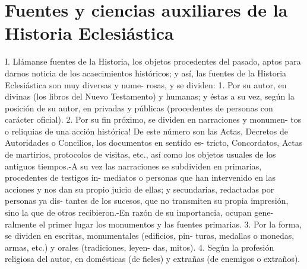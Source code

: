 \raggedbottom{} \documentclass[12pt]{book}
\begin{document}
\section{Fuentes y ciencias auxiliares de la Historia Eclesiástica}
I. Llámanse fuentes de la Historia, los objetos procedentes del
pasado, aptos para darnos noticia de los acaecimientos históricos; y
así, las fuentes de la Historia Eclesiástica son muy diversas y nume-
rosas, y se dividen: 1. Por su autor, en divinas (los libros del Nuevo
Testamento) y humanas; y éstas a su vez, según la posición de su
autor, en privadas y públicas (procedentes de personas con carácter
oficial). 2. Por su fin próximo, se dividen en narraciones y monumen-
tos o reliquias de una acción histórica! De este número son las Actas,
Decretos de Autoridades o Concilios, los documentos en sentido es-
tricto, Concordatos, Actas de martirios, protocolos de visitas, etc.,
así como los objetos usuales de los antiguos tiempos.-A su vez las
narraciones se subdividen en primarias, procedentes de testigos in-
mediatos o personas que han intervenido en las acciones y nos dan su
propio juicio de ellas; y secundarias, redactadas por personas ya dis-
tantes de los sucesos, que no transmiten su propia impresión, sino la
que de otros recibieron.-En razón de su importancia, ocupan gene-
ralmente el primer lugar los monumentos y las fuentes primarias.
3. Por la forma, se dividen en escritas, monumentales (edificios, pin-
turas, medallas o monedas, armas, etc.) y orales (tradiciones, leyen-
das, mitos). 4. Según la profesión religiosa del autor, en domésticas
(de fieles) y extrañas (de enemigos o extraños).
\end{document}
